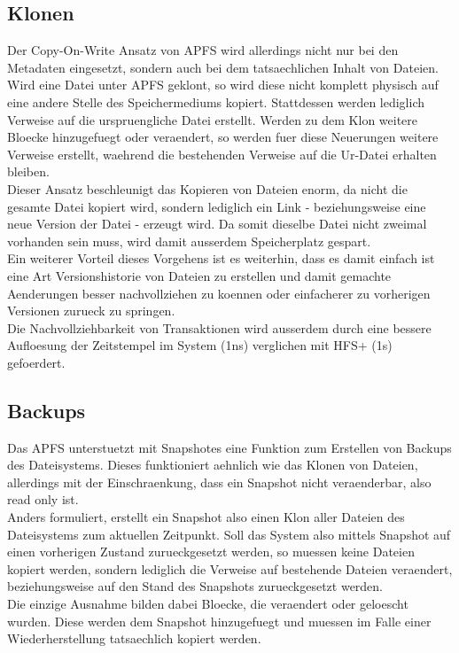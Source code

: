 \subsection{Klonen}
Der Copy-On-Write Ansatz von APFS wird allerdings nicht nur bei den Metadaten eingesetzt, sondern auch bei dem tatsaechlichen Inhalt von Dateien. Wird eine Datei unter APFS geklont, so wird diese nicht komplett physisch auf eine andere Stelle des Speichermediums kopiert. Stattdessen werden lediglich Verweise auf die urspruengliche Datei erstellt. Werden zu dem Klon weitere Bloecke hinzugefuegt oder veraendert, so werden fuer diese Neuerungen weitere Verweise erstellt, waehrend die bestehenden Verweise auf die Ur-Datei erhalten bleiben.\\
Dieser Ansatz beschleunigt das Kopieren von Dateien enorm, da nicht die gesamte Datei kopiert wird, sondern lediglich ein Link - beziehungsweise eine neue Version der Datei - erzeugt wird. Da somit dieselbe Datei nicht zweimal vorhanden sein muss, wird damit ausserdem Speicherplatz gespart.\\
Ein weiterer Vorteil dieses Vorgehens ist es weiterhin, dass es damit einfach ist eine Art Versionshistorie von Dateien zu erstellen und damit gemachte Aenderungen besser nachvollziehen zu koennen oder einfacherer zu vorherigen Versionen zurueck zu springen.\\
Die Nachvollziehbarkeit von Transaktionen wird ausserdem durch eine bessere Aufloesung der Zeitstempel im System (1ns) verglichen mit HFS+ (1s) gefoerdert.

\subsection{Backups}
Das APFS unterstuetzt mit Snapshotes eine Funktion zum Erstellen von Backups des Dateisystems. Dieses funktioniert aehnlich wie das Klonen von Dateien, allerdings mit der Einschraenkung, dass ein Snapshot nicht veraenderbar, also read only ist.\\
Anders formuliert, erstellt ein Snapshot also einen Klon aller Dateien des Dateisystems zum aktuellen Zeitpunkt. Soll das System also mittels Snapshot auf einen vorherigen Zustand zurueckgesetzt werden, so muessen keine Dateien kopiert werden, sondern lediglich die Verweise auf bestehende Dateien veraendert, beziehungsweise auf den Stand des Snapshots zurueckgesetzt werden.\\
Die einzige Ausnahme bilden dabei Bloecke, die veraendert oder geloescht wurden. Diese werden dem Snapshot hinzugefuegt und muessen im Falle einer Wiederherstellung tatsaechlich kopiert werden.

